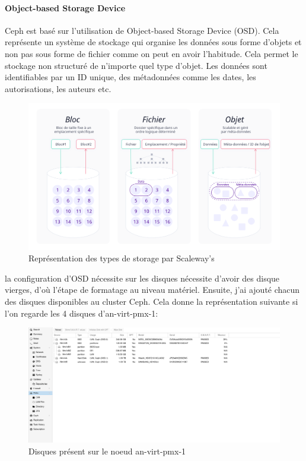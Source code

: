 \documentclass[12pt]{article}
\begin{document}
\paragraph{Object-based Storage Device}
Ceph est basé sur l'utilisation de Object-based Storage Device (OSD).
Cela représente un système de stockage qui organise les données sous forme d'objets et non pas sous forme de fichier comme on peut en avoir l'habitude.
Cela permet le stockage non structuré de n'importe quel type d'objet.
Les données sont identifiables par un ID unique, des métadonnées comme les dates, les autorisations, les auteurs etc.

\begin{figure}
    \centering
        \includegraphics[width=\textwidth]{src/types-de-storage.svg}
    \caption{Représentation des types de storage par Scaleway's}
    \label{fig:storage_types}
\end{figure}

la configuration d'OSD nécessite sur les disques nécessite d'avoir des disque vierges, d'où l'étape de formatage au niveau matériel.
Ensuite, j'ai ajouté chacun des disques disponibles au cluster Ceph.
Cela donne la représentation suivante si l'on regarde les 4 disques d'an-virt-pmx-1:

\begin{figure}
    \centering
        \includegraphics[width=\textwidth]{src/disk_node1.png}
    \caption{Disques présent sur le noeud an-virt-pmx-1}
    \label{fig:disk_node1}
\end{figure}
\end{document}
